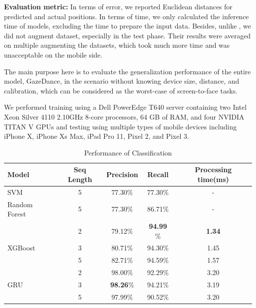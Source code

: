 \documentclass[acmlarge]{acmart}
\begin{document}

\textbf{Evaluation metric:} In terms of error, we reported Euclidean distances for predicted and actual positions. In terms of time, we only calculated the inference time of models, excluding the time to prepare the input data. Besides, unlike \cite{krafka2016eye}, we did not augment dataset, especially in the test phase. Their results were averaged on multiple augmenting the datasets, which took much more time and was unacceptable on the mobile side.

The main purpose here is to evaluate the generalization performance of the entire model, GazeDance, in the scenario without knowing device size, distance, and calibration, which can be considered as the worst-case of screen-to-face tasks.

We performed training using a Dell PowerEdge T640 server containing two Intel Xeon Silver 4110 2.10GHz 8-core processors, 64 GB of RAM, and four NVIDIA TITAN V GPUs and testing using multiple types of mobile devices including iPhone X, iPhone Xs Max, iPad Pro 11, Pixel 2, and Pixel 3.

\begin{table}
  \caption{Performance of Classification}
  \label{tab:classification}
  \begin{tabular}{lcccc}
    \toprule
    Model & Seq Length & Precision & Recall & Processing time(ms) \\
    \midrule
    SVM & 5 & 77.30\% & 77.30\% & - \\
    Random Forest & 5 & 77.30\% & 86.71\% & - \\
    \hline
     & 2 & 79.12\% & \textbf{94.99} \% & \textbf{1.34}\\
    XGBoost & 3 & 80.71\% & 94.30\% & 1.45\\
     & 5 & 82.71\% & 94.59\% & 1.57\\
    \hline
     & 2 & 98.00\% & 92.29\% & 3.20 \\
    GRU & 3 & \textbf{98.26}\% & 94.21\% & 3.19 \\
     & 5 & 97.99\% & 90.52\% & 3.20 \\
  \bottomrule
\end{tabular}
\end{table}

\end{document}
